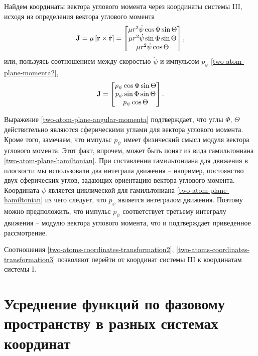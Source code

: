 Найдем координаты вектора углового момента через координаты системы III, исходя из определения вектора углового момента 
\begin{gather}
    \mathbf{J} = \mu \left[ \mathbf{r} \times \dot{\mathbf{r}} \right] = 
    \begin{bmatrix}
        \mu r^2 \dot{\psi} \cos \Phi \sin \Theta \\ 
        \mu r^2 \dot{\psi} \sin \Phi \sin \Theta \\
        \mu r^2 \dot{\psi} \cos \Theta
    \end{bmatrix},
\end{gather}
или, пользуясь соотношением между скоростью $\dot{\psi}$ и импульсом $p_\psi$ \eqref{two-atom-plane-momenta2}, 
\begin{gather}
    \mathbf{J} = 
    \begin{bmatrix}
        p_\psi \cos \Phi \sin \Theta \\
        p_\psi \sin \Phi \sin \Theta \\
        p_\psi \cos \Theta
    \end{bmatrix}. \label{two-atom-plane-angular-momenta}
\end{gather}

Выражение \eqref{two-atom-plane-angular-momenta} подтверждает, что углы $\Phi$, $\Theta$ действительно являются сферическими углами для вектора углового момента. Кроме того, замечаем, что импульс $p_\psi$ имеет физический смысл модуля вектора углового момента. Этот факт, впрочем, может быть понят из вида гамильтониана \eqref{two-atom-plane-hamiltonian}. При составлении гамильтониана для движения в плоскости мы использовали два интеграла движения -- например, постоянство двух сферических углов, задающих ориентацию вектора углового момента. Координата $\psi$ является циклической для гамильтониана \eqref{two-atom-plane-hamiltonian} из чего следует, что $p_\psi$ является интегралом движения. Поэтому можно предположить, что импульс $p_\psi$ соответствует третьему интегралу движения -- модулю вектора углового момента, что и подтверждает приведенное рассмотрение. \par
    Соотношения \eqref{two-atoms-coordinates-transformation2}, \eqref{two-atoms-coordinates-transformation3} позволяют перейти от координат системы III к координатам системы I.    
    \color{red}{Понадобятся ли все остальные переходы?}
\color{black}{}

\section{Усреднение функций по фазовому пространству в разных системах координат} \label{section:averaging}

